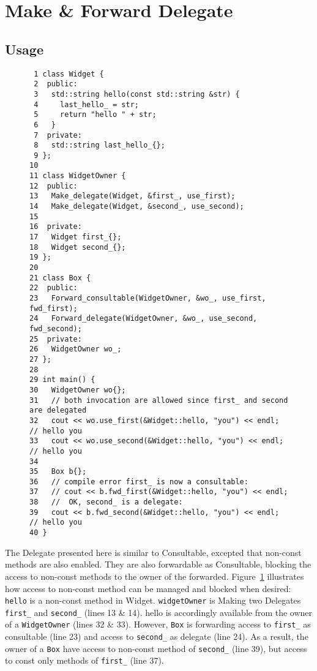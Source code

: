 \documentclass{article}
\begin{document}
\section{Make \& Forward Delegate}

\subsection{Usage}
\begin{figure}[ht]
{\small
\begin{lstlisting}
 1 class Widget {
 2  public:
 3   std::string hello(const std::string &str) {
 4     last_hello_ = str;
 5     return "hello " + str;
 6   }
 7  private:
 8   std::string last_hello_{};
 9 };
10 
11 class WidgetOwner {
12  public:
13   Make_delegate(Widget, &first_, use_first);
14   Make_delegate(Widget, &second_, use_second);
15   
16  private:
17   Widget first_{};
18   Widget second_{};
19 };
20 
21 class Box {
22  public:
23   Forward_consultable(WidgetOwner, &wo_, use_first, fwd_first);
24   Forward_delegate(WidgetOwner, &wo_, use_second, fwd_second);
25  private:
26   WidgetOwner wo_;
27 };
28 
29 int main() {
30   WidgetOwner wo{};
31   // both invocation are allowed since first_ and second are delegated
32   cout << wo.use_first(&Widget::hello, "you") << endl;   // hello you
33   cout << wo.use_second(&Widget::hello, "you") << endl;  // hello you
34 
35   Box b{};
36   // compile error first_ is now a consultable:
37   // cout << b.fwd_first(&Widget::hello, "you") << endl;  
38   //  OK, second_ is a delegate:
39   cout << b.fwd_second(&Widget::hello, "you") << endl;   // hello you
40 }
\end{lstlisting}}
\cprotect\caption{}
\label{example:delegate}
\end{figure}

The Delegate presented here is similar to Consultable, excepted that non-const methods are also enabled. They are also forwardable as Consultable, blocking the access to non-const methods to the owner of the forwarded. Figure~\ref{example:delegate} illustrates how access to non-const method can be managed and blocked when desired: \verb+hello+ is a non-const method in Widget. \verb+widgetOwner+ is Making two Delegates \verb+first_+ and \verb+second_+ (lines 13 \& 14). hello is accordingly available from the owner of a \verb+WidgetOwner+ (lines 32 \& 33). However, \verb+Box+ is forwarding access to \verb+first_+ as consultable (line 23) and access to \verb+second_+ as delegate (line 24). As a result, the owner of a \verb+Box+ have access to non-const method of \verb+second_+ (line 39), but access to const only methods of \verb+first_+ (line 37).     
\end{document}
